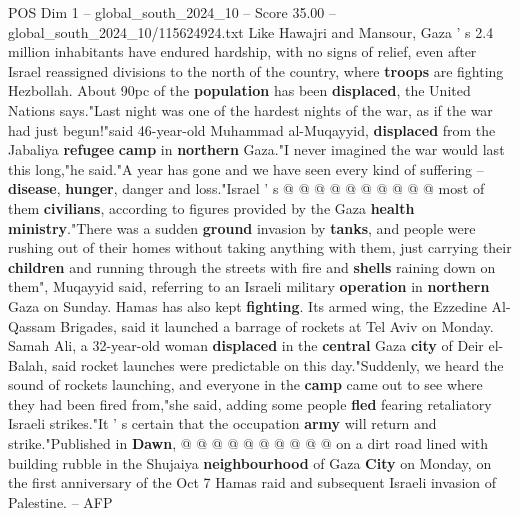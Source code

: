 \begin{textsample}{POS Dim 1 – global\_south\_2024\_10 – Score 35.00 – global\_south\_2024\_10/115624924.txt}
Like Hawajri and Mansour, Gaza ' s 2.4 million inhabitants have endured hardship, with no signs of relief, even after Israel reassigned divisions to the north of the country, where \textbf{troops} are fighting Hezbollah.
About 90pc of the \textbf{population} has been \textbf{displaced}, the United Nations says."Last night was one of the hardest nights of the war, as if the war had just begun!"said 46-year-old Muhammad al-Muqayyid, \textbf{displaced} from the Jabaliya \textbf{refugee} \textbf{camp} in \textbf{northern} Gaza."I never imagined the war would last this long,"he said."A year has gone and we have seen every kind of suffering -- \textbf{disease}, \textbf{hunger}, danger and loss."Israel ' s @ @ @ @ @ @ @ @ @ @ most of them \textbf{civilians}, according to figures provided by the Gaza \textbf{health} \textbf{ministry}."There was a sudden \textbf{ground} invasion by \textbf{tanks}, and people were rushing out of their homes without taking anything with them, just carrying their \textbf{children} and running through the streets with fire and \textbf{shells} raining down on them", Muqayyid said, referring to an Israeli military \textbf{operation} in \textbf{northern} Gaza on Sunday.
Hamas has also kept \textbf{fighting}.
Its armed wing, the Ezzedine Al-Qassam Brigades, said it launched a barrage of rockets at Tel Aviv on Monday.
Samah Ali, a 32-year-old woman \textbf{displaced} in the \textbf{central} Gaza \textbf{city} of Deir el-Balah, said rocket launches were predictable on this day."Suddenly, we heard the sound of rockets launching, and everyone in the \textbf{camp} came out to see where they had been fired from,"she said, adding some people \textbf{fled} fearing retaliatory Israeli strikes."It ' s certain that the occupation \textbf{army} will return and strike."Published in \textbf{Dawn}, @ @ @ @ @ @ @ @ @ @ on a dirt road lined with building rubble in the Shujaiya \textbf{neighbourhood} of Gaza \textbf{City} on Monday, on the first anniversary of the Oct 7 Hamas raid and subsequent Israeli invasion of Palestine. -- AFP

\end{textsample}
